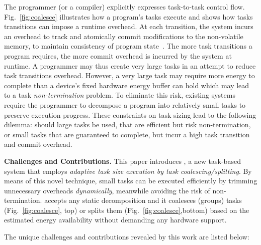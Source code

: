 The programmer (or a compiler) explicitly expresses task-to-task control flow. Fig.~\ref{fig:coalesce} illustrates how a program's tasks execute and shows how tasks transitions can impose a runtime overhead. At each transition, the system incurs an overhead to track and atomically commit modifications to the non-volatile memory, to maintain consistency of program state~\cite{chain,alpaca}. The more task transitions a program requires, the more commit overhead is incurred by the system at runtime. A programmer may thus create very large tasks in an attempt to reduce task transitions overhead. However, a very large task may require more energy to complete than a device's fixed hardware energy buffer can hold which may lead to a task \emph{non-termination} problem. To eliminate this risk, existing systems require the programmer to decompose a program into relatively small tasks to preserve execution progress. These constraints on task sizing lead to the following dilemma: should large tasks be used, that are efficient but risk non-termination, or small tasks that are guaranteed to complete, but incur a high task transition and commit overhead. 

\textbf{Challenges and Contributions.} This paper introduces \sys, a new task-based system that employs \emph{adaptive task size execution by task coalescing/splitting}. By means of this novel technique, small tasks can be executed efficiently by trimming unnecessary overheads \emph{dynamically}, meanwhile avoiding the risk of non-termination. \sys accepts any static decomposition and it coalesces (groups) tasks (Fig.~\ref{fig:coalesce}, top) or splits them (Fig.~\ref{fig:coalesce},bottom) based on the estimated energy availability without demanding any hardware support. 

The unique challenges and contributions revealed by this work are listed below:



